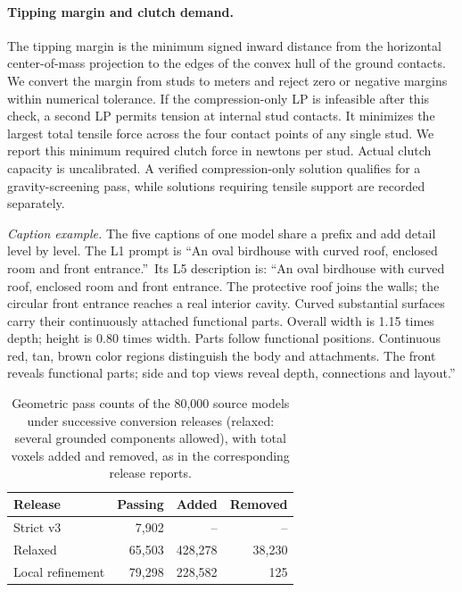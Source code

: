 \documentclass[letterpaper]{article} %
\begin{document}
\paragraph{Tipping margin and clutch demand.}
The tipping margin is the minimum signed inward distance from the horizontal center-of-mass projection to the edges of the convex hull of the ground contacts. We convert the margin from studs to meters and reject zero or negative margins within numerical tolerance. If the compression-only LP is infeasible after this check, a second LP permits tension at internal stud contacts. It minimizes the largest total tensile force across the four contact points of any single stud. We report this minimum required clutch force in newtons per stud. Actual clutch capacity is uncalibrated. A verified compression-only solution qualifies for a gravity-screening pass, while solutions requiring tensile support are recorded separately.

\emph{Caption example.} The five captions of one model share a prefix and add detail level by level. The L1 prompt is \textquotedblleft An oval birdhouse with curved roof, enclosed room and front entrance.\textquotedblright\ Its L5 description is: ``An oval birdhouse with curved roof, enclosed room and front entrance. The protective roof joins the walls; the circular front entrance reaches a real interior cavity. Curved substantial surfaces carry their continuously attached functional parts. Overall width is 1.15 times depth; height is 0.80 times width. Parts follow functional positions. Continuous red, tan, brown color regions distinguish the body and attachments. The front reveals functional parts; side and top views reveal depth, connections and layout.''

\begin{table}[!htbp]
\centering
\small
\setlength{\tabcolsep}{3pt}
\begin{tabular}{lrrr}
\toprule
Release & Passing & Added & Removed \\
\midrule
Strict v3 & 7,902 & -- & -- \\
Relaxed & 65,503 & 428,278 & 38,230 \\
Local refinement & 79,298 & 228,582 & 125 \\
\bottomrule
\end{tabular}
\caption{Geometric pass counts of the 80,000 source models under successive conversion releases (relaxed: several grounded components allowed), with total voxels added and removed, as in the corresponding release reports.}
\label{tab:conversion}
\end{table}
\end{document}
